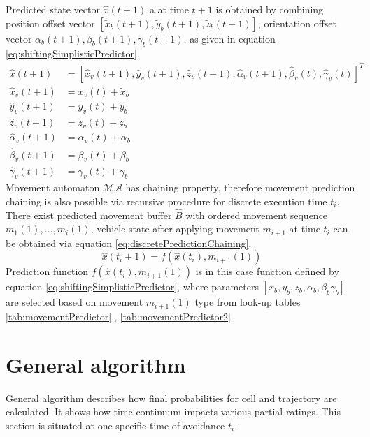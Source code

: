 Predicted state vector $\hat{x}(t+1)$ a at time $t+1$ is obtained by combining position offset vector $[\tilde{x}_b(t+1),\tilde{y}_b(t+1),\tilde{z}_b(t+1)]$, orientation offset vector $\alpha_b(t+1),\beta_b(t+1),\gamma_b(t+1)$. as given in equation \ref{eq:shiftingSimplisticPredictor}.
\begin{equation}\label{eq:shiftingSimplisticPredictor}
    \begin{aligned}
    \hat{x}(t+1) & = [\hat{x}_v(t+1),\hat{y}_v(t+1),\hat{z}_v(t+1),\hat{\alpha}_v(t+1),\hat{\beta}_v(t),\hat{\gamma}_v(t)]^T\\
    \hat{x}_v(t+1) & = x_v(t)+\tilde{x}_b\\
    \hat{y}_v(t+1) & = y_v(t)+\tilde{y}_b\\
    \hat{z}_v(t+1) & = z_v(t)+\tilde{z}_b\\
    \hat{\alpha}_v(t+1) & = \alpha_v(t) + \alpha_b\\
    \hat{\beta}_v(t+1) & = \beta_v(t) + \beta_b\\
    \hat{\gamma}_v(t+1) & = \gamma_v(t) + \gamma_b
    \end{aligned}
\end{equation}
Movement automaton $\mathscr{MA}$ has chaining property, therefore movement prediction chaining is also possible via recursive procedure for discrete execution time $t_i$. There exist predicted movement buffer $\hat{B}$ with ordered movement sequence $m_1(1),\dots,m_i(1)$, vehicle state after applying movement $m_{i+1}$ at time $t_i$ can be obtained via equation \ref{eq:discretePredictionChaining}.
\begin{equation}\label{eq:discretePredictionChaining}
    \hat{x}(t_i+1) = f(\hat{x}(t_i),m_{i+1}(1))
\end{equation}
Prediction function $f(\hat{x}(t_i),m_{i+1}(1))$ is in this case function defined by equation \ref{eq:shiftingSimplisticPredictor}, where parameters $[x_b,y_b,z_b,\alpha_b,\beta_b\gamma_b]$ are selected based on movement $m_{i+1}(1)$ type from look-up tables  \ref{tab:movementPredictor}., \ref{tab:movementPredictor2}.



\section{General algorithm}\label{sec:general algorithm}
\noindent General algorithm describes how final probabilities for cell and trajectory are calculated. It shows how time continuum impacts various partial ratings. This section is situated at one specific time of avoidance $t_i$. 

